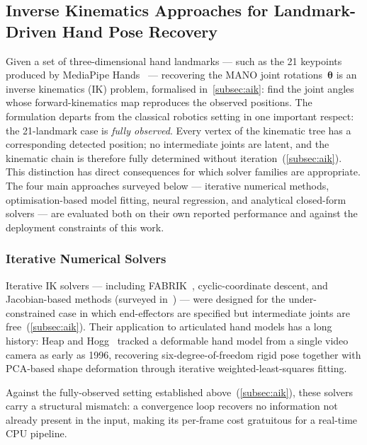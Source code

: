 \subsection{Inverse Kinematics Approaches for Landmark-Driven Hand Pose Recovery}
\label{subsec:sota_ik}

Given a set of three-dimensional hand landmarks --- such as the 21
keypoints produced by MediaPipe Hands~\cite{zhang2020mediapipehands}
--- recovering the MANO joint rotations~$\boldsymbol{\theta}$ is an
inverse kinematics (IK) problem, formalised in~\autoref{subsec:aik}:
find the joint angles whose forward-kinematics map reproduces the
observed positions.
The formulation departs from the classical robotics setting in one
important respect: the 21-landmark case is \emph{fully observed}.
Every vertex of the kinematic tree has a corresponding detected
position; no intermediate joints are latent, and the kinematic chain
is therefore fully determined without iteration~(\autoref{subsec:aik}).
This distinction has direct consequences for which solver families are
appropriate.
The four main approaches surveyed below --- iterative numerical methods,
optimisation-based model fitting, neural regression, and analytical
closed-form solvers --- are evaluated both on their own reported
performance and against the deployment constraints of this work.



\subsubsection{Iterative Numerical Solvers}\label{subsubsec:sota_ik_iterative}

Iterative IK solvers --- including FABRIK~\cite{aristidou2011fabrik},
cyclic-coordinate descent, and Jacobian-based methods
(surveyed in~\cite{aristidou2018iksurvey}) --- were designed for the
under-constrained case in which end-effectors are specified but
intermediate joints are free~(\autoref{subsec:aik}).
Their application to articulated hand models has a long history:
Heap and Hogg~\cite{heap1996dynamic} tracked a deformable hand model
from a single video camera as early as 1996, recovering
six-degree-of-freedom rigid pose together with PCA-based shape
deformation through iterative weighted-least-squares fitting.

Against the fully-observed setting established above~(\autoref{subsec:aik}),
these solvers carry a structural mismatch: a convergence loop recovers no
information not already present in the input, making its per-frame cost
gratuitous for a real-time CPU pipeline.



